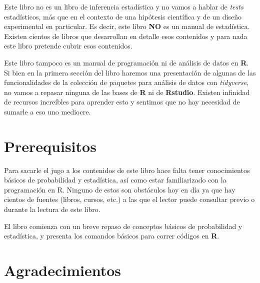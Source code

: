 \documentclass[
  letterpaper,
  DIV=11,
  numbers=noendperiod,
  oneside]{scrreprt}
\begin{document}
Este libro no es un libro de inferencia estadística y no vamos a hablar
de \emph{tests} estadísticos, más que en el contexto de una hipótesis
científica y de un diseño experimental en particular. Es decir, este
libro \textbf{NO} es un manual de estadística. Existen cientos de libros
que desarrollan en detalle esos contenidos y para nada este libro
pretende cubrir esos contenidos.

Este libro tampoco es un manual de programación ni de análisis de datos
en \textbf{R}. Si bien en la primera sección del libro haremos una
presentación de algunas de las funcionalidades de la colección de
paquetes para análisis de datos con \emph{tidyverse}, no vamos a repasar
ninguna de las bases de \textbf{R} ni de \textbf{Rstudio}. Existen
infinidad de recursos increíbles para aprender esto y sentimos que no
hay necesidad de sumarle a eso uno mediocre.

\hypertarget{prerequisitos}{%
\section*{Prerequisitos}\label{prerequisitos}}

Para sacarle el jugo a los contenidos de este libro hace falta tener
conocimientos básicos de probabilidad y estadística, así como estar
familiarizado con la programación en R. Ninguno de estos son obstáculos
hoy en día ya que hay cientos de fuentes (libros, cursos, etc.) a las
que el lector puede consultar previo o durante la lectura de este libro.

\begin{tcolorbox}[enhanced jigsaw, breakable, rightrule=.15mm, colbacktitle=quarto-callout-warning-color!10!white, bottomtitle=1mm, arc=.35mm, titlerule=0mm, left=2mm, toprule=.15mm, leftrule=.75mm, colback=white, opacitybacktitle=0.6, opacityback=0, colframe=quarto-callout-warning-color-frame, bottomrule=.15mm, coltitle=black, toptitle=1mm, title={DON'T PANIC}]
El libro comienza con un breve repaso de conceptos básicos de
probabilidad y estadística, y presenta los comandos básicos para correr
códigos en \textbf{R}.
\end{tcolorbox}

\hypertarget{agradecimientos}{%
\section*{Agradecimientos}\label{agradecimientos}}
\end{document}
